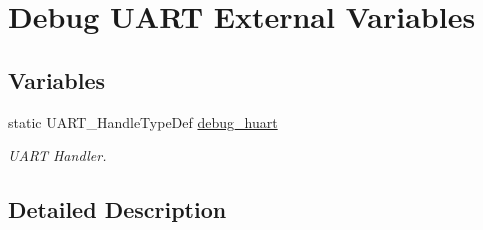 \hypertarget{group___debug___u_a_r_t___external___variables}{}\section{Debug U\+A\+RT External Variables}
\label{group___debug___u_a_r_t___external___variables}
\subsection*{Variables}
\begin{DoxyCompactItemize}
\item 
static U\+A\+R\+T\+\_\+\+Handle\+Type\+Def \hyperlink{group___debug___u_a_r_t___external___variables_gaa020232170a049fcc321246bd778a49f}{debug\+\_\+huart}\hypertarget{group___debug___u_a_r_t___external___variables_gaa020232170a049fcc321246bd778a49f}{}\label{group___debug___u_a_r_t___external___variables_gaa020232170a049fcc321246bd778a49f}

\begin{DoxyCompactList}\small\item\em U\+A\+RT Handler. \end{DoxyCompactList}\end{DoxyCompactItemize}


\subsection{Detailed Description}
